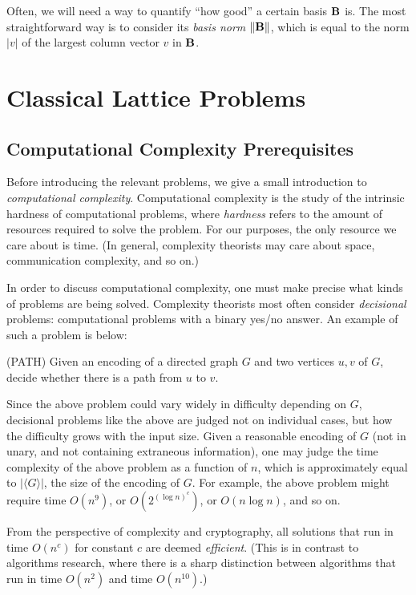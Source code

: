 Often, we will need a way to quantify ``how good'' a certain basis $\textbf{B}$ is. The most straightforward way is to consider its \emph{basis norm} $\Vert \textbf{B} \Vert$, which is equal to the norm $|v|$ of the largest column vector $v$ in $\textbf{B}$.


\section{Classical Lattice Problems}
\label{sec:latticeproblems}

\subsection{Computational Complexity Prerequisites} \label{sec: complexityintro}
    Before introducing the relevant problems, we give a small introduction to \emph{computational complexity}. Computational complexity is the study of the intrinsic hardness of computational problems, where \emph{hardness} refers to the amount of resources required to solve the problem. For our purposes, the only resource we care about is time. (In general, complexity theorists may care about space, communication complexity, and so on.)

    In order to discuss computational complexity, one must make precise what kinds of problems are being solved. Complexity theorists most often consider \emph{decisional} problems: computational problems with a binary yes/no answer. An example of such a problem is below:

    \begin{definition} (PATH)
        Given an encoding of a directed graph $G$ and two vertices $u, v$ of $G$, decide whether there is a path from $u$ to $v$.
    \end{definition}

    Since the above problem could vary widely in difficulty depending on $G$, decisional problems like the above are judged not on individual cases, but how the difficulty grows with the input size. Given a reasonable encoding of $G$ (not in unary, and not containing extraneous information), one may judge the time complexity of the above problem as a function of $n$, which is approximately equal to $|\langle G \rangle|$, the size of the encoding of $G$. For example, the above problem might require time $O(n^9)$, or $O(2^{(\log n)^c})$, or $O(n \log n)$, and so on.

    From the perspective of complexity and cryptography, all solutions that run in time $O(n^c)$ for constant $c$ are deemed \emph{efficient}. (This is in contrast to algorithms research, where there is a sharp distinction between algorithms that run in time $O(n^2)$ and time $O(n^{10})$.)

